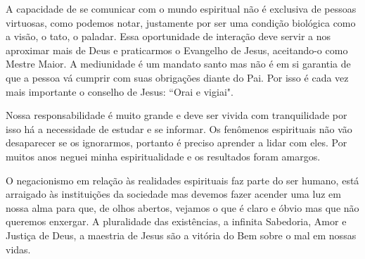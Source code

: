 \emdash{}A capacidade de se comunicar com o mundo espiritual não é exclusiva de pessoas virtuosas, como podemos notar, justamente por ser uma condição biológica como a visão, o tato, o paladar. Essa oportunidade de interação deve servir a nos aproximar mais de Deus e praticarmos o Evangelho de Jesus, aceitando-o como Mestre Maior. A mediunidade é um mandato santo mas não é em si garantia de que a pessoa vá cumprir com suas obrigações diante do Pai. Por isso é cada vez mais importante o conselho de Jesus: ``Orai e vigiai".

\emdash{}Nossa responsabilidade é muito grande e deve ser vivida com tranquilidade por isso há a necessidade de estudar e se informar. Os fenômenos espirituais não vão desaparecer se os ignorarmos, portanto é preciso aprender a lidar com eles. Por muitos anos neguei minha espiritualidade e os resultados foram amargos. 

\emdash{}O negacionismo em relação às realidades espirituais faz parte do ser humano, está arraigado às instituições da sociedade mas devemos fazer acender uma luz em nossa alma para que, de olhos abertos, vejamos o que é claro e óbvio mas que não queremos enxergar. A pluralidade das existências, a infinita Sabedoria, Amor e Justiça de Deus, a maestria de Jesus são a vitória do Bem sobre o mal em nossas vidas.